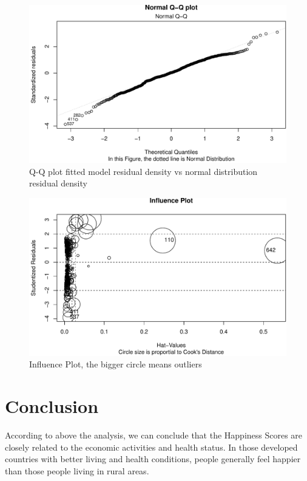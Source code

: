 \documentclass[11pt,a4paper,]{article}
\begin{document}
\begin{figure}
\centering
\includegraphics{Assignment4_files/figure-latex/qq-1.pdf}
\caption{\label{fig:qq}Q-Q plot fitted model residual density vs normal distribution residual density}
\end{figure}

\begin{figure}
\centering
\includegraphics{Assignment4_files/figure-latex/inf-1.pdf}
\caption{\label{fig:inf}Influence Plot, the bigger circle means outliers}
\end{figure}

\clearpage

\hypertarget{conclusion}{%
\section{Conclusion}\label{conclusion}}

According to above the analysis, we can conclude that the Happiness Scores are closely related to the economic activities and health status. In those developed countries with better living and health conditions, people generally feel happier than those people living in rural areas.
\end{document}
